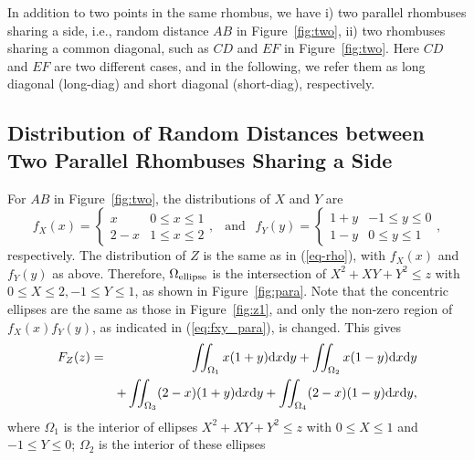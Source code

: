 \documentclass[12pt,draftclsnofoot,onecolumn]{IEEEtran}
\begin{document}
In addition to two points in the same rhombus, we have i) two parallel rhombuses
sharing a side, i.e., random distance $AB$ in Figure~\ref{fig:two}, ii) two
rhombuses sharing a common diagonal, such as $CD$ and $EF$ in Figure~\ref{fig:two}. 
Here $CD$ and $EF$ are two different cases, and in the following, we refer 
them as long diagonal (long-diag) and short diagonal (short-diag), respectively.

\subsection{Distribution of Random Distances between Two Parallel Rhombuses Sharing a
Side}


For $AB$ in Figure~\ref{fig:two}, the distributions of $X$ and $Y$ are
\begin{equation}\label{eq:fxy_para}
  f_X(x)=\left\{
    \begin{array}{lr}
      x & 0\leq x \leq 1 \\
      2-x & 1 \leq x \leq 2
    \end{array}
  \right.,
  ~~\mbox{ and }~~ f_Y(y)=\left\{
    \begin{array}{lr}
      1+y & -1\leq y \leq 0 \\
      1-y & 0 \leq y \leq 1
    \end{array}
  \right.,
\end{equation}
respectively.
The distribution of $Z$ is the same as in (\ref{eq-rho}), with
$f_X(x)$ and $f_Y(y)$ as above. Therefore, $\Omega_{\rm ellipse}$ %
is the intersection of $X^2+XY+Y^2 \leq z$ with $0 \leq X \leq 2, -1\leq Y \leq 1$,
as shown in Figure~\ref{fig:para}. 
Note that the concentric ellipses are the same as those in Figure~\ref{fig:z1}, 
and only the non-zero region of $f_X(x)f_Y(y)$, as indicated in (\ref{eq:fxy_para}), 
is changed. This gives
\begin{eqnarray}\label{eq:para}
 F_Z(z)&=&\iint_{\Omega_1}x(1+y){\rm d}x{\rm d}y+\iint_{\Omega_2}x(1-y){\rm
d}x{\rm d}y\nonumber \\
&&+\iint_{\Omega_3}(2-x)(1+y){\rm d}x{\rm d}y+\iint_{\Omega_4}(2-x)(1-y){\rm
d}x{\rm d}y,
\end{eqnarray}
where $\Omega_1$ is the interior of ellipses $X^2+XY+Y^2 \leq z$ with $0 \leq X
\leq 1$ and $-1 \leq Y \leq 0$; $\Omega_2$ is the interior of these ellipses
\end{document}
